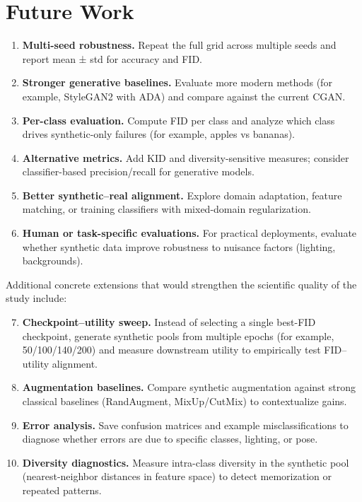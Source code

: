 \section{Future Work}

\begin{enumerate}
\item \textbf{Multi-seed robustness.} Repeat the full grid across multiple seeds and report mean ± std for accuracy and FID.
\item \textbf{Stronger generative baselines.} Evaluate more modern methods (for example, StyleGAN2 with ADA) and compare against the current CGAN.
\item \textbf{Per-class evaluation.} Compute FID per class and analyze which class drives synthetic-only failures (for example, apples vs bananas).
\item \textbf{Alternative metrics.} Add KID and diversity-sensitive measures; consider classifier-based precision/recall for generative models.
\item \textbf{Better synthetic--real alignment.} Explore domain adaptation, feature matching, or training classifiers with mixed-domain regularization.
\item \textbf{Human or task-specific evaluations.} For practical deployments, evaluate whether synthetic data improve robustness to nuisance factors (lighting, backgrounds).
\end{enumerate}

Additional concrete extensions that would strengthen the scientific quality of the study include:

\begin{enumerate}
\setcounter{enumi}{6}
\item \textbf{Checkpoint--utility sweep.} Instead of selecting a single best-FID checkpoint, generate synthetic pools from multiple epochs (for example, 50/100/140/200) and measure downstream utility to empirically test FID--utility alignment.
\item \textbf{Augmentation baselines.} Compare synthetic augmentation against strong classical baselines (RandAugment, MixUp/CutMix) to contextualize gains.
\item \textbf{Error analysis.} Save confusion matrices and example misclassifications to diagnose whether errors are due to specific classes, lighting, or pose.
\item \textbf{Diversity diagnostics.} Measure intra-class diversity in the synthetic pool (nearest-neighbor distances in feature space) to detect memorization or repeated patterns.
\end{enumerate}
